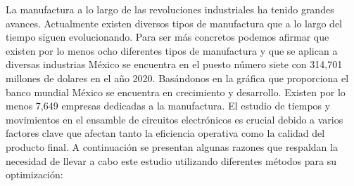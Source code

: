     La manufactura a lo largo de las revoluciones industriales ha tenido grandes avances. Actualmente existen diversos tipos de manufactura que a lo largo del tiempo siguen evolucionando.
        Para ser más concretos podemos afirmar que existen por lo menos ocho diferentes tipos de manufactura y que se aplican a diversas industrias
        México se encuentra en el puesto número siete con 314,701 millones de dolares en el año 2020.
        Basándonos en la gráfica que proporciona el banco mundial México se encuentra en crecimiento y desarrollo.
        Existen por lo menos 7,649 empresas dedicadas a la manufactura.
        El estudio de tiempos y movimientos en el ensamble de circuitos electrónicos es crucial debido a varios factores clave que afectan tanto la eficiencia operativa como la calidad del producto final. A continuación se presentan algunas razones que respaldan la necesidad de llevar a cabo este estudio utilizando diferentes métodos para su optimización:
